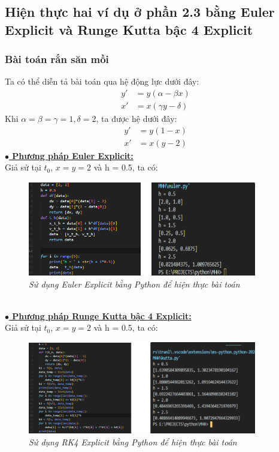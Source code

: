 \documentclass[13pt,a4paper]{article}
\begin{document}
		\subsection{Hiện thực hai ví dụ ở phần 2.3 bằng Euler Explicit và Runge Kutta bậc 4 Explicit}
			\subsubsection{Bài toán rắn săn mồi}
				Ta có thể diễn tả bài toán qua hệ động lực dưới đây:
				\begin{align*}
					y' &= y(\alpha - \beta x) \\
					x' &= x(\gamma y - \delta)
				\end{align*}
				Khi $\alpha = \beta = \gamma = 1, \delta = 2$, ta được hệ dưới đây:
				\begin{align*}
					y' &= y(1 - x) \\
					x' &= x(y - 2)
				\end{align*}
				\textbf{\underline{$\bullet$ Phương pháp Euler Explicit:}} \\
					Giả sử tại $t_0$, $x = y = 2$ và h = 0.5, ta có:
					\begin{figure}[h!]
						\begin{center}
							\includegraphics[width=10cm]{snake_euler.png}
							\caption{\textit{Sử dụng Euler Explicit bằng Python để hiện thực bài toán}}
						\end{center}
					\end{figure}
				\\
				\textbf{\underline{$\bullet$ Phương pháp Runge Kutta bậc 4 Explicit:}} \\
				Giả sử tại $t_0$, $x = y = 2$ và h = 0.5, ta có:
				\begin{figure}[h!]
					\begin{center}
						\includegraphics[width=10cm]{snake_kutta.png}
						\caption{\textit{Sử dụng RK4 Explicit bằng Python để hiện thực bài toán}}
					\end{center}
				\end{figure}
\end{document}

